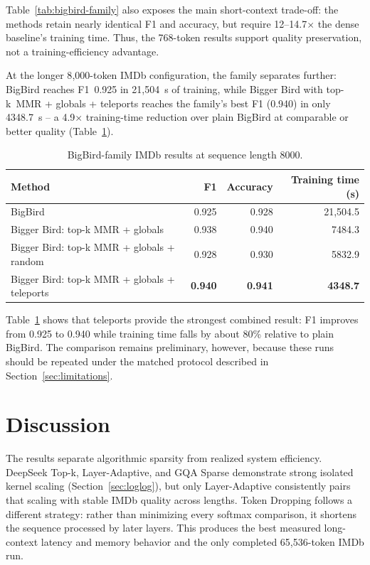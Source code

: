 \documentclass[11pt]{article}
\begin{document}
Table~\ref{tab:bigbird-family} also exposes the main short-context trade-off:
the methods retain nearly identical F1 and accuracy, but require
12--14.7$\times$ the dense baseline's training time. Thus, the 768-token
results support quality preservation, not a training-efficiency advantage.

At the longer 8{,}000-token IMDb configuration, the family separates further:
BigBird reaches F1~0.925 in 21{,}504~s of training, while Bigger Bird with
top-k~MMR + globals + teleports reaches the family's best F1 (0.940) in only
4348.7~s -- a 4.9$\times$ training-time reduction over plain BigBird at
comparable or better quality (Table~\ref{tab:bigbird-8000}).

\begin{table}[ht]
  \centering
  \small
  \caption{BigBird-family IMDb results at sequence length 8000.}
  \label{tab:bigbird-8000}
  \begin{tabular}{@{}lrrr@{}}
    \toprule
    Method & F1 & Accuracy & Training time (s) \\
    \midrule
    BigBird & 0.925 & 0.928 & 21{,}504.5 \\
    Bigger Bird: top-k MMR + globals & 0.938 & 0.940 & 7484.3 \\
    Bigger Bird: top-k MMR + globals + random & 0.928 & 0.930 & 5832.9 \\
    Bigger Bird: top-k MMR + globals + teleports & \textbf{0.940} & \textbf{0.941} & \textbf{4348.7} \\
    \bottomrule
  \end{tabular}
\end{table}

Table~\ref{tab:bigbird-8000} shows that teleports provide the strongest
combined result: F1 improves from 0.925 to 0.940 while training time falls by
about 80\% relative to plain BigBird. The comparison remains preliminary,
however, because these runs should be repeated under the matched protocol
described in Section~\ref{sec:limitations}.

\FloatBarrier
\section{Discussion}

The results separate algorithmic sparsity from realized system efficiency.
DeepSeek Top-k, Layer-Adaptive, and GQA Sparse demonstrate strong isolated
kernel scaling (Section~\ref{sec:loglog}), but only Layer-Adaptive consistently
pairs that scaling with stable IMDb quality across lengths. Token Dropping
follows a different strategy: rather than minimizing every softmax comparison,
it shortens the sequence processed by later layers. This produces the best
measured long-context latency and memory behavior and the only completed
65{,}536-token IMDb run.
\end{document}
